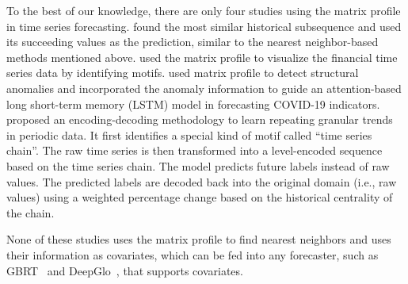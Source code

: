To the best of our knowledge, there are only four studies using the matrix profile in time series forecasting.
\cite{thi2021forecast} found the most similar historical subsequence and used its succeeding values as the prediction, similar to the nearest neighbor-based methods mentioned above.
\cite{cartwright2021financial} used the matrix profile to visualize the financial time series data by identifying motifs.
\cite{liu2021novel} used matrix profile to detect structural anomalies and incorporated the anomaly information to guide an attention-based long short-term memory (LSTM) model in forecasting COVID-19 indicators.
\cite{saha2022improving} proposed an encoding-decoding methodology to learn repeating granular trends in periodic data.
It first identifies a special kind of motif called ``time series chain''.
The raw time series is then transformed into a level-encoded sequence based on the time series chain. The model predicts future labels instead of raw values. The predicted labels are decoded back into the original domain (i.e., raw values) using a weighted percentage change based on the historical centrality of the chain.

None of these studies uses the matrix profile to find nearest neighbors and uses their information as covariates, which can be fed into any forecaster, such as GBRT~\cite{elsayed2021we} and DeepGlo~\cite{sen2019think}, that supports covariates.